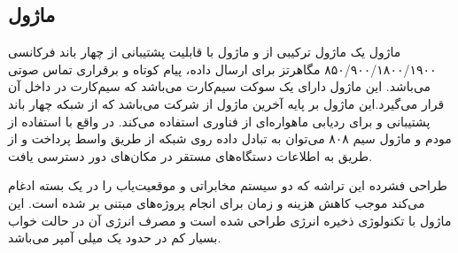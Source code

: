 \subsection{ماژول }

ماژول  یک ماژول ترکیبی از  و ماژول   با قابلیت پشتیبانی از چهار باند فرکانسی ۸۵۰/۹۰۰/۱۸۰۰/۱۹۰۰ مگاهرتز  برای ارسال داده، پیام کوتاه  و برقراری تماس صوتی می‌باشد. این ماژول دارای یک سوکت سیم‌کارت می‌باشد که سیم‌کارت در داخل آن قرار می‌گیرد.این ماژول بر پایه آخرین ماژول  از شرکت  می‌باشد که از شبکه چهار باند  پشتیبانی و برای ردیابی ماهواره‌ای از فناوری  استفاده می‌کند. در واقع با استفاده از مودم  و ماژول سیم ۸۰۸ می‌توان به تبادل داده روی شبکه  از طریق واسط  پرداخت و از طریق به اطلاعات دستگاه‌های مستقر در مکان‌های دور دسترسی یافت.

طراحی فشرده این تراشه که دو سیستم مخابراتی و موقعیت‌یاب را در یک بسته ادغام می‌کند موجب کاهش هزینه و زمان برای انجام پروژه‌های مبتنی بر  شده است. این ماژول با تکنولوژی ذخیره انرژی طراحی شده است و مصرف انرژی آن در حالت خواب بسیار کم در حدود یک میلی آمپر می‌باشد.
 

